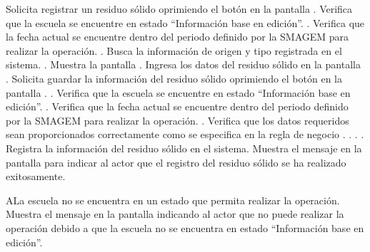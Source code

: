  \begin{UCtrayectoria}
    \UCpaso[\UCactor] Solicita registrar un residuo sólido oprimiendo el botón  en la pantalla .
    \UCpaso[\UCsist] Verifica que la escuela se encuentre en estado ``Información base en edición''. .
    \UCpaso[\UCsist] Verifica que la fecha actual se encuentre dentro del periodo definido por la SMAGEM para realizar la operación. .
    \UCpaso[\UCsist] Busca la información de origen y tipo registrada en el sistema. .
    \UCpaso[\UCsist] Muestra la pantalla .
    \UCpaso[\UCactor] Ingresa los datos del residuo sólido en la pantalla . \label{cuibr2:Registrar}
    \UCpaso[\UCactor] Solicita guardar la información del residuo sólido oprimiendo el botón  en la pantalla . .
    \UCpaso[\UCsist] Verifica que la escuela se encuentre en estado ``Información base en edición''. .
    \UCpaso[\UCsist] Verifica que la fecha actual se encuentre dentro del periodo definido por la SMAGEM para realizar la operación. .
    \UCpaso[\UCsist] Verifica que los datos requeridos sean proporcionados correctamente como se especifica en la regla de negocio . . . .    
    \UCpaso[\UCsist] Registra la información del residuo sólido en el sistema.
    \UCpaso[\UCsist] Muestra el mensaje  en la pantalla  para indicar al actor que el registro del residuo sólido se ha realizado exitosamente. 
    
 \end{UCtrayectoria}
 
   \begin{UCtrayectoriaA}{A}{La escuela no se encuentra en un estado que permita realizar la operación.}
    \UCpaso[\UCsist] Muestra el mensaje  en la pantalla  indicando al actor que no puede realizar la operación debido a que la escuela no se encuentra en estado ``Información base en edición''. 
 \end{UCtrayectoriaA}

